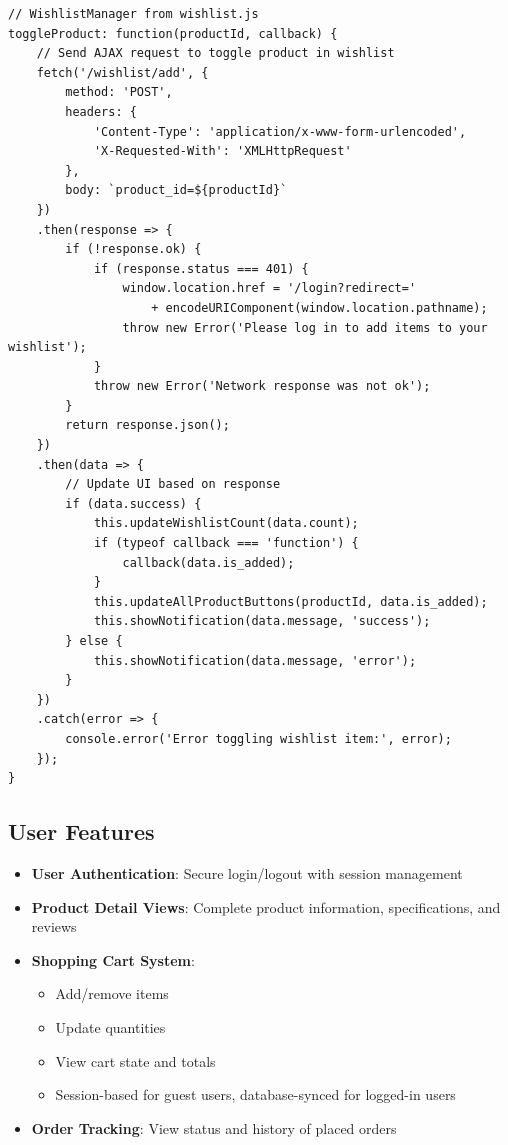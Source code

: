 \documentclass[14pt,a4paper]{article}
\begin{document}
\begin{lstlisting}[caption=Wishlist toggle functionality]
// WishlistManager from wishlist.js
toggleProduct: function(productId, callback) {
    // Send AJAX request to toggle product in wishlist
    fetch('/wishlist/add', {
        method: 'POST',
        headers: {
            'Content-Type': 'application/x-www-form-urlencoded',
            'X-Requested-With': 'XMLHttpRequest'
        },
        body: `product_id=${productId}`
    })
    .then(response => {
        if (!response.ok) {
            if (response.status === 401) {
                window.location.href = '/login?redirect=' 
                    + encodeURIComponent(window.location.pathname);
                throw new Error('Please log in to add items to your wishlist');
            }
            throw new Error('Network response was not ok');
        }
        return response.json();
    })
    .then(data => {
        // Update UI based on response
        if (data.success) {
            this.updateWishlistCount(data.count);
            if (typeof callback === 'function') {
                callback(data.is_added);
            }
            this.updateAllProductButtons(productId, data.is_added);
            this.showNotification(data.message, 'success');
        } else {
            this.showNotification(data.message, 'error');
        }
    })
    .catch(error => {
        console.error('Error toggling wishlist item:', error);
    });
}
\end{lstlisting}

\subsection{User Features}
\begin{itemize}
    \item \textbf{User Authentication}: Secure login/logout with session management
    \item \textbf{Product Detail Views}: Complete product information, specifications, and reviews
    \item \textbf{Shopping Cart System}:
        \begin{itemize}
            \item Add/remove items
            \item Update quantities
            \item View cart state and totals
            \item Session-based for guest users, database-synced for logged-in users
        \end{itemize}
    \item \textbf{Order Tracking}: View status and history of placed orders
\end{itemize}
\end{document}
